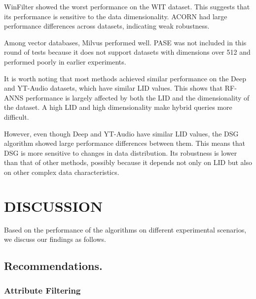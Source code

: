 \documentclass[sigconf, nonacm]{acmart}
\begin{document}
WinFilter showed the worst performance on the WIT dataset. This suggests that its performance is sensitive to the data dimensionality. ACORN had large performance differences across datasets, indicating weak robustness.

Among vector databases, Milvus performed well. PASE was not included in this round of tests because it does not support datasets with dimensions over 512 and performed poorly in earlier experiments.

It is worth noting that most methods achieved similar performance on the Deep and YT-Audio datasets, which have similar LID values. This shows that RF-ANNS performance is largely affected by both the LID and the dimensionality of the dataset. A high LID and high dimensionality make hybrid queries more difficult.

However, even though Deep and YT-Audio have similar LID values, the DSG algorithm showed large performance differences between them. This means that DSG is more sensitive to changes in data distribution. Its robustness is lower than that of other methods, possibly because it depends not only on LID but also on other complex data characteristics.
%	
	
	\section{DISCUSSION}
	Based on the performance of the algorithms on different experimental scenarios, we discuss our findings as follows.
	
	
	\subsection{Recommendations.}
	\subsubsection{\textbf{Attribute Filtering}}
	
\end{document}
